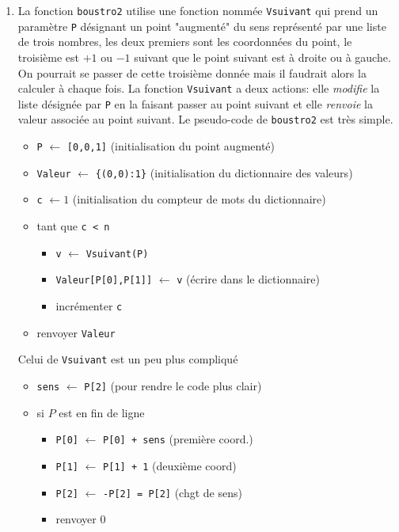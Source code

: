 \begin{enumerate}
\begin{enumerate}
\item La fonction \verb|boustro2| utilise une fonction nommée \verb|Vsuivant| qui prend un paramètre \verb|P| désignant un point "augmenté" du sens représenté par une liste de trois nombres, les deux premiers sont les coordonnées du point, le troisième est $+1$ ou $-1$ suivant que le point suivant est à droite ou à gauche. On pourrait se passer de cette troisième donnée mais il faudrait alors la calculer à chaque fois. La fonction \verb|Vsuivant| a deux actions: elle \emph{modifie} la liste désignée par \verb|P| en la faisant passer au point suivant et elle \emph{renvoie} la valeur associée au point suivant.\newline
Le pseudo-code de \verb|boustro2| est très simple.
\begin{itemize}
  \item \verb|P| $\longleftarrow$ \verb|[0,0,1]| (initialisation du point augmenté)
  \item \verb|Valeur| $\longleftarrow$ \verb|{(0,0):1}| (initialisation du dictionnaire des valeurs)
  \item \verb|c| $\longleftarrow 1$ (initialisation du compteur de mots du dictionnaire)
  \item tant que \verb|c < n|
  \begin{itemize}
    \item \verb|v| $\longleftarrow$ \verb|Vsuivant(P)|
    \item \verb|Valeur[P[0],P[1]]| $\longleftarrow$ \verb|v| (écrire dans le dictionnaire)
    \item incrémenter \verb|c|
  \end{itemize}
  \item renvoyer \verb|Valeur|
\end{itemize}
Celui de \verb|Vsuivant| est un peu plus compliqué
\begin{itemize}
  \item \verb|sens| $\longleftarrow$ \verb|P[2]| (pour rendre le code plus clair) 
  \item si $P$ est en fin de ligne
  \begin{itemize}
    \item \verb|P[0]| $\longleftarrow$ \verb|P[0] + sens| (première coord.)
    \item \verb|P[1]| $\longleftarrow$ \verb|P[1] + 1| (deuxième coord)
    \item \verb|P[2]| $\longleftarrow$ \verb|-P[2] = P[2]| (chgt de sens)
    \item renvoyer 0
  \end{itemize}

\end{itemize}
\end{enumerate}
\end{enumerate}
